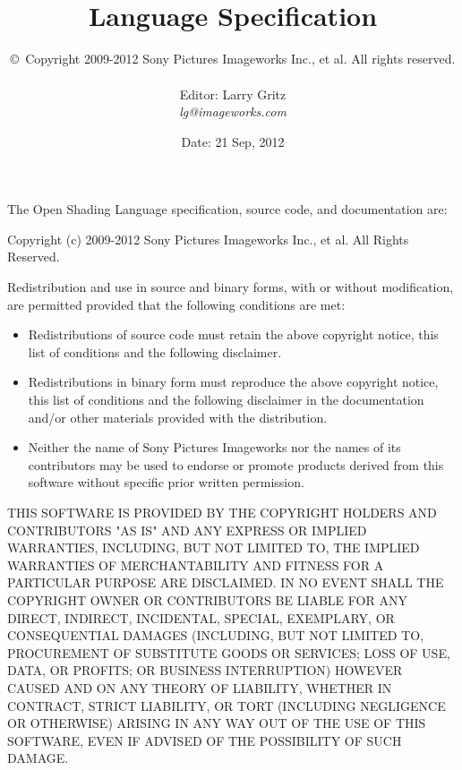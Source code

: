 \documentclass[11pt,letterpaper]{book}
\title{ 
{\Huge{\bf \product}
{\bf\sffamily \versionnumber} \medskip \\ \huge 
Language Specification
} \bigskip }
\author{
\copyright\ Copyright 2009-2012 Sony Pictures Imageworks Inc., et al. All rights reserved.
 \bigskip \\
\vspace{1in} \\
Editor: Larry Gritz \\
\emph{lg@imageworks.com}
 \bigskip \\
}
\date{{\large Date: 21 Sep, 2012 \\
}}
\begin{document}
\frontmatter

\maketitle

\newpage
\label{speccopyr}

\vspace*{0.2in}

\noindent The Open Shading Language specification, source code, and
documentation are:

\vspace*{0.2in}

Copyright (c) 2009-2012 Sony Pictures Imageworks Inc., et al.
All Rights Reserved.

\vspace*{0.2in}

Redistribution and use in source and binary forms, with or without
modification, are permitted provided that the following conditions are
met:

\begin{itemize}
\item Redistributions of source code must retain the above copyright
  notice, this list of conditions and the following disclaimer.
\item Redistributions in binary form must reproduce the above copyright
  notice, this list of conditions and the following disclaimer in the
  documentation and/or other materials provided with the distribution.
\item Neither the name of Sony Pictures Imageworks nor the names of its
  contributors may be used to endorse or promote products derived from
  this software without specific prior written permission.
\end{itemize}

THIS SOFTWARE IS PROVIDED BY THE COPYRIGHT HOLDERS AND CONTRIBUTORS
"AS IS" AND ANY EXPRESS OR IMPLIED WARRANTIES, INCLUDING, BUT NOT
LIMITED TO, THE IMPLIED WARRANTIES OF MERCHANTABILITY AND FITNESS FOR
A PARTICULAR PURPOSE ARE DISCLAIMED. IN NO EVENT SHALL THE COPYRIGHT
OWNER OR CONTRIBUTORS BE LIABLE FOR ANY DIRECT, INDIRECT, INCIDENTAL,
SPECIAL, EXEMPLARY, OR CONSEQUENTIAL DAMAGES (INCLUDING, BUT NOT
LIMITED TO, PROCUREMENT OF SUBSTITUTE GOODS OR SERVICES; LOSS OF USE,
DATA, OR PROFITS; OR BUSINESS INTERRUPTION) HOWEVER CAUSED AND ON ANY
THEORY OF LIABILITY, WHETHER IN CONTRACT, STRICT LIABILITY, OR TORT
(INCLUDING NEGLIGENCE OR OTHERWISE) ARISING IN ANY WAY OUT OF THE USE
OF THIS SOFTWARE, EVEN IF ADVISED OF THE POSSIBILITY OF SUCH DAMAGE.
\end{document}
